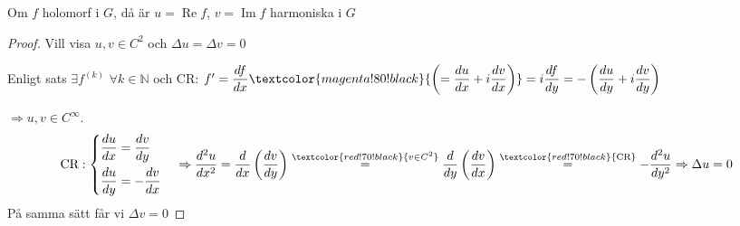 \begin{theorem}[Proposition 6.3]
Om $f$ holomorf i $G$, då är $u = \operatorname{Re} f$, $v = \operatorname{Im} f$ harmoniska i $G$
\end{theorem}
\begin{proof}
Vill visa $u, v \in C^2$ och $\Delta u = \Delta v = 0$

Enligt sats $\exists f^{(k)}$ $\forall k \in \mathbb{N}$ och CR: $f' = \dfrac{df}{dx} \textcolor{magenta!80!black}{\left(= \dfrac{du}{dx} + i\dfrac{dv}{dx}\right)} = i\dfrac{df}{dy} = -\left( \dfrac{du}{dy} + i\dfrac{dv}{dy} \right)$

$\Longrightarrow u, v \in C^\infty$.
\[ \text{CR}: \begin{cases} \dfrac{du}{dx} = \dfrac{dv}{dy} \\[2ex] \dfrac{du}{dy} = -\dfrac{dv}{dx} \end{cases} \Rightarrow \frac{d^2u}{dx^2} = \frac{d}{dx}\left( \frac{dv}{dy} \right) \overset{\textcolor{red!70!black}{v \in C^2}}{=} \frac{d}{dy}\left( \frac{dv}{dx} \right) \overset{\textcolor{red!70!black}{\text{CR}}}{=} -\frac{d^2u}{dy^2} \Rightarrow \Delta u = 0 \]
På samma sätt får vi $\Delta v = 0$
\end{proof}
